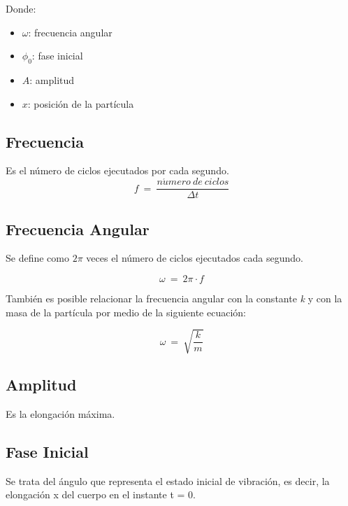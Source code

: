 \documentclass[../main.tex]{subfiles}
\begin{document}
Donde:

\begin{itemize}
    \item $\omega$: frecuencia angular
    \item $\phi_0$: fase inicial
    \item $A$: amplitud
    \item $x$: posición de la partícula
\end{itemize}

\subsection{Frecuencia}
Es el número de ciclos ejecutados por cada segundo. \cite{sears}
\begin{equation} \label{freq}
    f\:=\:\frac{n\acute{u}mero\:de\:ciclos}{\Delta t}
\end{equation}

\subsection{Frecuencia Angular}

Se define como $2\pi$ veces el número de ciclos ejecutados cada segundo.

\begin{equation} \label{freq_ang_1}
    \omega\:=\:2\pi \cdot f
\end{equation}

También es posible relacionar la frecuencia angular con la constante \textit{k} y
con la masa de la partícula por medio de la siguiente ecuación:

\begin{equation} \label{freq_ang_2}
    \omega\:=\: \sqrt{\frac{k}{m}}
\end{equation}

\subsection{Amplitud}

Es la elongación máxima.\cite{web_mas}

\subsection{Fase Inicial}

Se trata del ángulo que representa el estado inicial de vibración, 
es decir, la elongación x del cuerpo en el instante t = 0. \parencite{web_mas}
\end{document}
